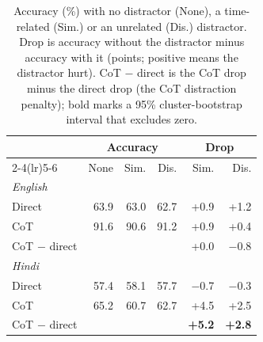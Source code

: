 \begin{table}[t]
\centering
\small
\setlength{\tabcolsep}{4pt}
\begin{tabular}{lrrrrr}
\toprule
 & \multicolumn{3}{c}{Accuracy} & \multicolumn{2}{c}{Drop} \\
\cmidrule(lr){2-4}\cmidrule(lr){5-6}
 & None & Sim. & Dis. & Sim. & Dis. \\
\midrule
\multicolumn{6}{l}{\textit{English}} \\
\quad Direct & 63.9 & 63.0 & 62.7 & +0.9 & +1.2 \\
\quad CoT & 91.6 & 90.6 & 91.2 & +0.9 & +0.4 \\
\quad CoT $-$ direct &  &  &  & +0.0 & $-$0.8 \\
\midrule
\multicolumn{6}{l}{\textit{Hindi}} \\
\quad Direct & 57.4 & 58.1 & 57.7 & $-$0.7 & $-$0.3 \\
\quad CoT & 65.2 & 60.7 & 62.7 & +4.5 & +2.5 \\
\quad CoT $-$ direct &  &  &  & \textbf{+5.2} & \textbf{+2.8} \\
\bottomrule
\end{tabular}
\caption{Accuracy (\%) with no distractor (None), a time-related (Sim.) or an unrelated (Dis.) distractor. Drop is accuracy without the distractor minus accuracy with it (points; positive means the distractor hurt). CoT $-$ direct is the CoT drop minus the direct drop (the CoT distraction penalty); bold marks a 95\% cluster-bootstrap interval that excludes zero.}
\label{tab:distractor}
\end{table}
